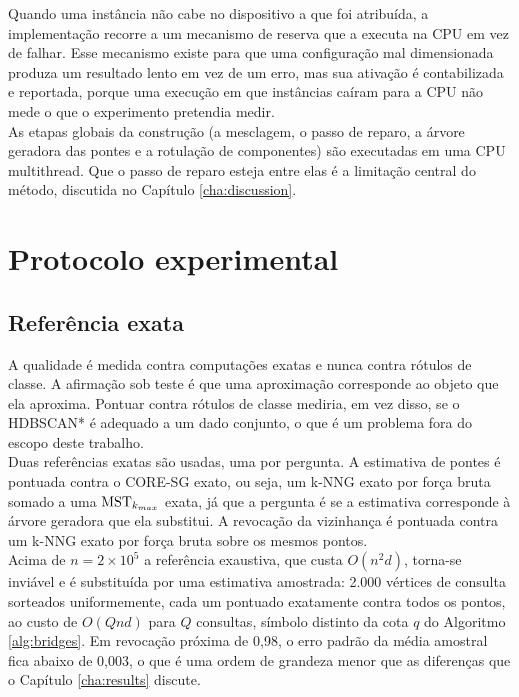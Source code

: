 Quando uma instância não cabe no dispositivo a que foi atribuída, a implementação recorre a um mecanismo de reserva que a executa na \ac{CPU} em vez de falhar. Esse mecanismo existe para que uma configuração mal dimensionada produza um resultado lento em vez de um erro, mas sua ativação é contabilizada e reportada, porque uma execução em que instâncias caíram para a \ac{CPU} não mede o que o experimento pretendia medir.\\

As etapas globais da construção (a mesclagem, o passo de reparo, a árvore geradora das pontes e a rotulação de componentes) são executadas em uma \ac{CPU} multithread. Que o passo de reparo esteja entre elas é a limitação central do método, discutida no Capítulo \ref{cha:discussion}.\\

\section{Protocolo experimental\label{sec:protocol}}

\subsection{Referência exata\label{sec:ground-truth}}

A qualidade é medida contra computações exatas e nunca contra rótulos de classe. A afirmação sob teste é que uma aproximação corresponde ao objeto que ela aproxima. Pontuar contra rótulos de classe mediria, em vez disso, se o \ac{HDBSCAN*} é adequado a um dado conjunto, o que é um problema fora do escopo deste trabalho.\\

Duas referências exatas são usadas, uma por pergunta. A estimativa de pontes é pontuada contra o \ac{CORE-SG} exato, ou seja, um \ac{k-NNG} exato por força bruta somado a uma $\mathrm{MST}_{k_{max}}$ exata, já que a pergunta é se a estimativa corresponde à árvore geradora que ela substitui. A revocação da vizinhança é pontuada contra um \ac{k-NNG} exato por força bruta sobre os mesmos pontos.\\

Acima de $n = 2 \times 10^5$ a referência exaustiva, que custa $O(n^2 d)$, torna-se inviável e é substituída por uma estimativa amostrada: 2.000 vértices de consulta sorteados uniformemente, cada um pontuado exatamente contra todos os pontos, ao custo de $O(Q n d)$ para $Q$ consultas, símbolo distinto da cota $q$ do Algoritmo \ref{alg:bridges}. Em revocação próxima de 0,98, o erro padrão da média amostral fica abaixo de 0,003, o que é uma ordem de grandeza menor que as diferenças que o Capítulo \ref{cha:results} discute.\\

